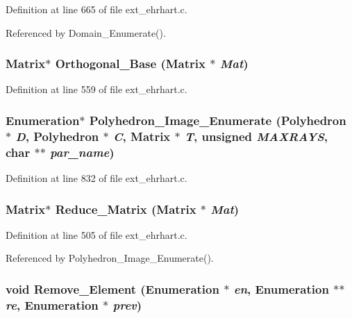 Definition at line 665 of file ext\_\-ehrhart.c.

Referenced by Domain\_\-Enumerate().

\subsubsection{\setlength{\rightskip}{0pt plus 5cm}Matrix$\ast$ Orthogonal\_\-Base (Matrix $\ast$ {\em Mat})}\label{ext__ehrhart_8c_a12}




Definition at line 559 of file ext\_\-ehrhart.c.
\subsubsection{\setlength{\rightskip}{0pt plus 5cm}Enumeration$\ast$ Polyhedron\_\-Image\_\-Enumerate (Polyhedron $\ast$ {\em D}, Polyhedron $\ast$ {\em C}, Matrix $\ast$ {\em T}, unsigned {\em MAXRAYS}, char $\ast$$\ast$ {\em par\_\-name})}\label{ext__ehrhart_8c_a20}




Definition at line 832 of file ext\_\-ehrhart.c.
\subsubsection{\setlength{\rightskip}{0pt plus 5cm}Matrix$\ast$ Reduce\_\-Matrix (Matrix $\ast$ {\em Mat})}\label{ext__ehrhart_8c_a9}




Definition at line 505 of file ext\_\-ehrhart.c.

Referenced by Polyhedron\_\-Image\_\-Enumerate().

\subsubsection{\setlength{\rightskip}{0pt plus 5cm}void Remove\_\-Element (Enumeration $\ast$ {\em en}, Enumeration $\ast$$\ast$ {\em re}, Enumeration $\ast$ {\em prev})}\label{ext__ehrhart_8c_a13}




